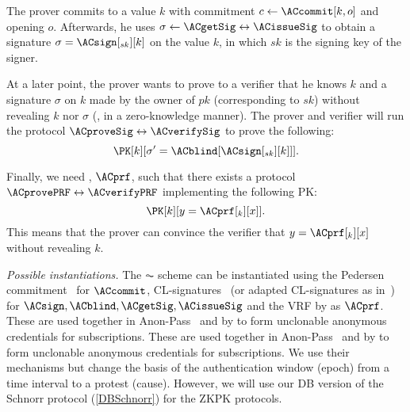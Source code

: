The prover commits to a value \(k\) with commitment \(c\gets \ACcommit[k, o]\) and opening \(o\).
Afterwards, he uses \(\sigma\gets \ACgetSig\leftrightarrow \ACissueSig\) to obtain a signature \(\sigma = \ACsign[_{sk}][k]\) on the value \(k\), in which \(sk\) is the signing key of the signer.

At a later point, the prover wants to prove to a verifier that he knows \(k\) and a signature \(\sigma\) on \(k\) made by the owner of \(pk\) (corresponding to \(sk\)) without revealing \(k\) nor \(\sigma\) (\ie, in a zero-knowledge manner).
The prover and verifier will run the protocol \(\ACproveSig\leftrightarrow \ACverifySig\) to prove the following:
\begin{equation*}
  \PK[k][\sigma' = \ACblind[\ACsign[_{sk}][k]]].
\end{equation*}


Finally, we need , \(\ACprf\), such that there exists a protocol \(\ACprovePRF\leftrightarrow \ACverifyPRF\) implementing the following 
\ac{PK}:
\begin{equation*}
  \PK[k][y = \ACprf[_k][x]].
\end{equation*}
This means that the prover can convince the verifier that \(y = \ACprf[_k][x]\) without revealing \(k\).


\emph{Possible instantiations.}
The \(\AC\) scheme can be instantiated using the Pedersen commitment~\cite{PedersenCommitment} for \(\ACcommit\),
CL-signatures~\cite{CLsignatures} (or adapted CL-signatures as in~\cite{AnonPass}) for \(\ACsign, \ACblind, \ACgetSig, \ACissueSig\) and the \ac{VRF} by \citet{DY-VRF} as \(\ACprf\).
These are used together in \eg Anon-Pass~\cite{AnonPass} and by \citet{HowToWinTheCloneWars} to form unclonable anonymous credentials for subscriptions.
These are used together in \eg Anon-Pass~\cite{AnonPass} and by 
\citet{HowToWinTheCloneWars} to form unclonable anonymous credentials for 
subscriptions.
We use their mechanisms but change the basis of the authentication window 
(epoch) from a time interval to a protest (cause).
However, we will use our \ac{DB} version of the Schnorr protocol 
(\cref{DBSchnorr}) for the \ac{ZKPK} protocols.
